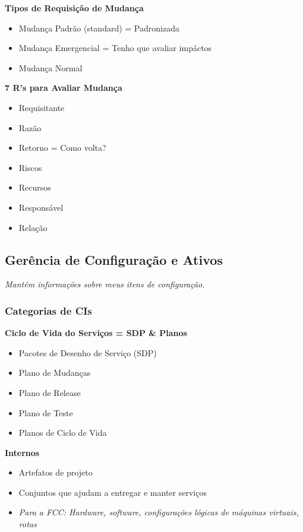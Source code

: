 \textbf{Tipos de Requisição de Mudança}
\begin{itemize}
	\item Mudança Padrão (standard) = Padronizada
	\item Mudança Emergencial = Tenho que avaliar impáctos
	\item Mudança Normal
\end{itemize}


\textbf{7 R's para Avaliar Mudança}
\begin{itemize}
	\item Requisitante
	\item Razão
	\item Retorno = Como volta?
	\item Riscos
	\item Recursos
	\item Responsável
	\item Relação
\end{itemize}


\subsection{Gerência de Configuração e Ativos}

\begin{center}
	\emph{Mantém informações sobre meus itens de configuração.}
\end{center}

\subsubsection{Categorias de CIs}

\textbf{Ciclo de Vida do Serviços = SDP \& Planos}
\begin{itemize}
	\item Pacotes de Desenho de Serviço (SDP)
	\item Plano de Mudanças
	\item Plano de Release
	\item Plano de Teste
	\item Planos de Ciclo de Vida
\end{itemize}

\textbf{Internos}
\begin{itemize}
	\item Artefatos de projeto
	\item Conjuntos que ajudam a entregar e manter serviços
	\item \emph{Para a FCC: Hardware, software, configurações lógicas de máquinas virtuais, rotas} 
\end{itemize}


